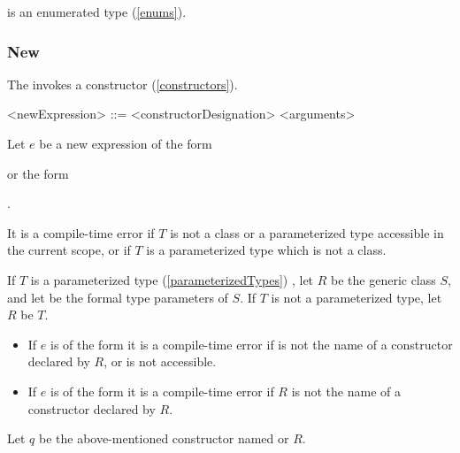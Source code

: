 \documentclass[makeidx]{article}
\begin{document}
{

\noindent
is an enumerated type (\ref{enums}).


\subsubsection{New}

\LMHash{}%
The  invokes a constructor (\ref{constructors}).

\begin{grammar}
<newExpression> ::= \NEW{} <constructorDesignation> <arguments>
\end{grammar}

\LMHash{}%
Let $e$ be a new expression of the form

or the form

.

\LMHash{}%
It is a compile-time error if $T$ is not
a class or a parameterized type accessible in the current scope,
or if $T$ is a parameterized type which is not a class.

\LMHash{}%
If $T$ is a parameterized type (\ref{parameterizedTypes})
,
let $R$ be the generic class $S$,
and let
be the formal type parameters of $S$.
If $T$ is not a parameterized type, let $R$ be $T$.

\begin{itemize}
\item
  If $e$ is of the form
  it is a compile-time error if  is not the name of
  a constructor declared by $R$, or \id{} is not accessible.
\item
  If $e$ is of the form
  it is a compile-time error if $R$ is not the name of
  a constructor declared by $R$.
\end{itemize}

\LMHash{}%
Let $q$ be the above-mentioned constructor named  or $R$.

}
\end{document}
